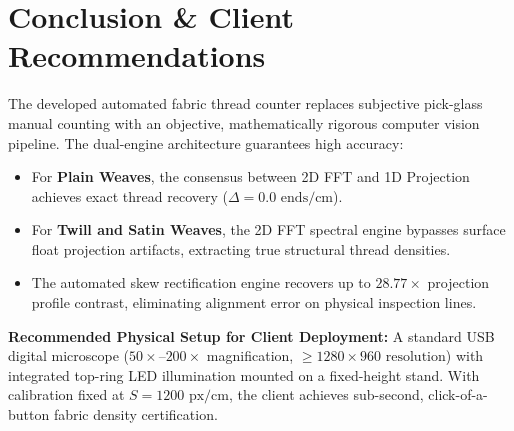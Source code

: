 \documentclass[11pt,a4paper]{article}
\begin{document}
\section{Conclusion \& Client Recommendations}

The developed automated fabric thread counter replaces subjective pick-glass manual counting with an objective, mathematically rigorous computer vision pipeline. The dual-engine architecture guarantees high accuracy:
\begin{itemize}
    \item For \textbf{Plain Weaves}, the consensus between 2D FFT and 1D Projection achieves exact thread recovery ($\Delta = 0.0\text{ ends/cm}$).
    \item For \textbf{Twill and Satin Weaves}, the 2D FFT spectral engine bypasses surface float projection artifacts, extracting true structural thread densities.
    \item The automated skew rectification engine recovers up to $28.77\times$ projection profile contrast, eliminating alignment error on physical inspection lines.
\end{itemize}

\textbf{Recommended Physical Setup for Client Deployment:}
A standard USB digital microscope ($50\times\text{--}200\times$ magnification, $\ge 1280\times 960\text{ resolution}$) with integrated top-ring LED illumination mounted on a fixed-height stand. With calibration fixed at $S = 1200\text{ px/cm}$, the client achieves sub-second, click-of-a-button fabric density certification.
\end{document}
